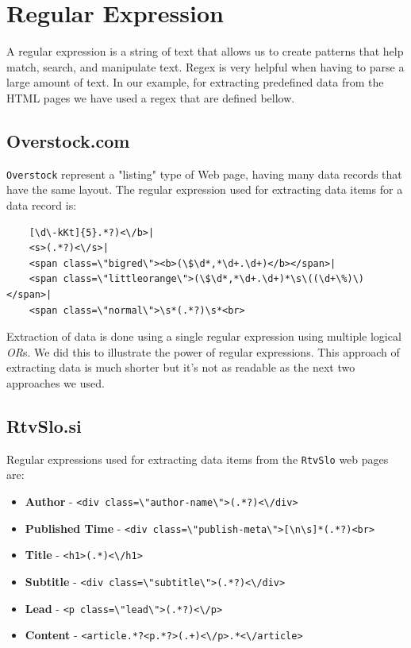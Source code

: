 \documentclass{article}
\begin{document}
	\section{Regular Expression}
	A regular expression is a string of text that allows us to create patterns that help match, search, and manipulate text. Regex is very helpful when having to parse a large amount of text. In our example, for extracting predefined data from the HTML pages we have used a regex that are defined bellow.
	\subsection{Overstock.com}
	\texttt{Overstock} represent a "listing" type of Web page, having many data records that have the same layout. The regular expression used for extracting data items for a data record is:    
	\begin{Verbatim}
	[\d\-kKt]{5}.*?)<\/b>|
	<s>(.*?)<\/s>|
	<span class=\"bigred\"><b>(\$\d*,*\d+.\d+)</b></span>|
	<span class=\"littleorange\">(\$\d*,*\d+.\d+)*\s\((\d+\%)\)</span>|
	<span class=\"normal\">\s*(.*?)\s*<br>
	\end{Verbatim}
	Extraction of data is done using a single regular expression using multiple logical \textit{OR}s. We did this to illustrate the power of regular expressions. This approach of extracting data is much shorter but it's not as readable as the next two approaches we used. 
	
	\subsection{RtvSlo.si}
	Regular expressions used for extracting data items from the \texttt{RtvSlo} web pages are:
	\begin{itemize}
		\item \textbf{Author} - \verb|<div class=\"author-name\">(.*?)<\/div>|
		\item \textbf{Published Time} - \verb|<div class=\"publish-meta\">[\n\s]*(.*?)<br>|
		\item \textbf{Title} - \verb|<h1>(.*)<\/h1>| 
		\item \textbf{Subtitle} - \verb|<div class=\"subtitle\">(.*?)<\/div>|
		\item \textbf{Lead} - \verb|<p class=\"lead\">(.*?)<\/p>|
		\item \textbf{Content} - \verb|<article.*?<p.*?>(.+)<\/p>.*<\/article>|
	\end{itemize}
	
\end{document}

